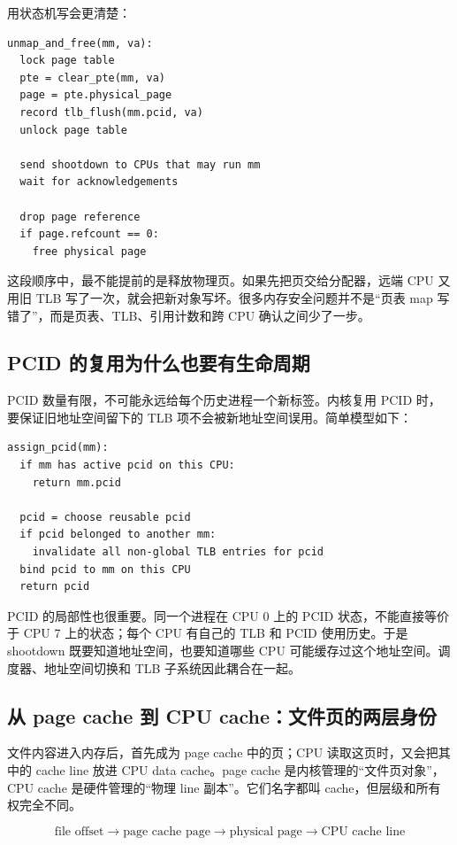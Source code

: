用状态机写会更清楚：

\begin{lstlisting}
unmap_and_free(mm, va):
  lock page table
  pte = clear_pte(mm, va)
  page = pte.physical_page
  record tlb_flush(mm.pcid, va)
  unlock page table

  send shootdown to CPUs that may run mm
  wait for acknowledgements

  drop page reference
  if page.refcount == 0:
    free physical page
\end{lstlisting}

这段顺序中，最不能提前的是释放物理页。如果先把页交给分配器，远端 CPU 又用旧 TLB 写了一次，就会把新对象写坏。很多内存安全问题并不是“页表 map 写错了”，而是页表、TLB、引用计数和跨 CPU 确认之间少了一步。

\subsection{PCID 的复用为什么也要有生命周期}

PCID 数量有限，不可能永远给每个历史进程一个新标签。内核复用 PCID 时，要保证旧地址空间留下的 TLB 项不会被新地址空间误用。简单模型如下：

\begin{lstlisting}
assign_pcid(mm):
  if mm has active pcid on this CPU:
    return mm.pcid

  pcid = choose reusable pcid
  if pcid belonged to another mm:
    invalidate all non-global TLB entries for pcid
  bind pcid to mm on this CPU
  return pcid
\end{lstlisting}

PCID 的局部性也很重要。同一个进程在 CPU 0 上的 PCID 状态，不能直接等价于 CPU 7 上的状态；每个 CPU 有自己的 TLB 和 PCID 使用历史。于是 shootdown 既要知道地址空间，也要知道哪些 CPU 可能缓存过这个地址空间。调度器、地址空间切换和 TLB 子系统因此耦合在一起。

\subsection{从 page cache 到 CPU cache：文件页的两层身份}

文件内容进入内存后，首先成为 page cache 中的页；CPU 读取这页时，又会把其中的 cache line 放进 CPU data cache。page cache 是内核管理的“文件页对象”，CPU cache 是硬件管理的“物理 line 副本”。它们名字都叫 cache，但层级和所有权完全不同。

\[
\text{file offset} \rightarrow \text{page cache page}
\rightarrow \text{physical page}
\rightarrow \text{CPU cache line}
\]

